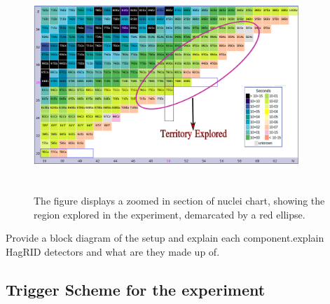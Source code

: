 \begin{figure}[h]
    \centering
    \includegraphics[width=10cm, height=8cm]{figures/nuclie_chart_plot.png}
    \caption[The figure displays a zoomed-in section of nuclei chart]{The figure displays a zoomed in section of nuclei chart, showing the region explored in the experiment, demarcated by a red ellipse.}
    \label{fig:chart_nuclie}
\end{figure}

Provide a block diagram of the setup and explain each component.explain HagRID detectors and what are they made up of. 



\subsection{Trigger Scheme for the experiment}
